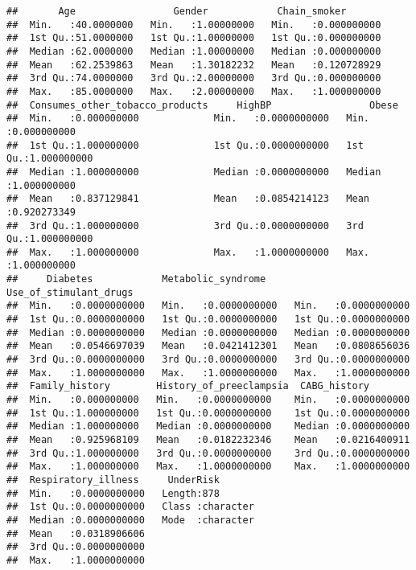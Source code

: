 \documentclass[
  10pt,
  spanish,
]{article}
\begin{document}
\begin{verbatim}
##       Age                 Gender            Chain_smoker        
##  Min.   :40.0000000   Min.   :1.00000000   Min.   :0.000000000  
##  1st Qu.:51.0000000   1st Qu.:1.00000000   1st Qu.:0.000000000  
##  Median :62.0000000   Median :1.00000000   Median :0.000000000  
##  Mean   :62.2539863   Mean   :1.30182232   Mean   :0.120728929  
##  3rd Qu.:74.0000000   3rd Qu.:2.00000000   3rd Qu.:0.000000000  
##  Max.   :85.0000000   Max.   :2.00000000   Max.   :1.000000000  
##  Consumes_other_tobacco_products     HighBP                 Obese            
##  Min.   :0.000000000             Min.   :0.0000000000   Min.   :0.000000000  
##  1st Qu.:1.000000000             1st Qu.:0.0000000000   1st Qu.:1.000000000  
##  Median :1.000000000             Median :0.0000000000   Median :1.000000000  
##  Mean   :0.837129841             Mean   :0.0854214123   Mean   :0.920273349  
##  3rd Qu.:1.000000000             3rd Qu.:0.0000000000   3rd Qu.:1.000000000  
##  Max.   :1.000000000             Max.   :1.0000000000   Max.   :1.000000000  
##     Diabetes            Metabolic_syndrome     Use_of_stimulant_drugs
##  Min.   :0.0000000000   Min.   :0.0000000000   Min.   :0.0000000000  
##  1st Qu.:0.0000000000   1st Qu.:0.0000000000   1st Qu.:0.0000000000  
##  Median :0.0000000000   Median :0.0000000000   Median :0.0000000000  
##  Mean   :0.0546697039   Mean   :0.0421412301   Mean   :0.0808656036  
##  3rd Qu.:0.0000000000   3rd Qu.:0.0000000000   3rd Qu.:0.0000000000  
##  Max.   :1.0000000000   Max.   :1.0000000000   Max.   :1.0000000000  
##  Family_history        History_of_preeclampsia  CABG_history         
##  Min.   :0.000000000   Min.   :0.0000000000    Min.   :0.0000000000  
##  1st Qu.:1.000000000   1st Qu.:0.0000000000    1st Qu.:0.0000000000  
##  Median :1.000000000   Median :0.0000000000    Median :0.0000000000  
##  Mean   :0.925968109   Mean   :0.0182232346    Mean   :0.0216400911  
##  3rd Qu.:1.000000000   3rd Qu.:0.0000000000    3rd Qu.:0.0000000000  
##  Max.   :1.000000000   Max.   :1.0000000000    Max.   :1.0000000000  
##  Respiratory_illness     UnderRisk        
##  Min.   :0.0000000000   Length:878        
##  1st Qu.:0.0000000000   Class :character  
##  Median :0.0000000000   Mode  :character  
##  Mean   :0.0318906606                     
##  3rd Qu.:0.0000000000                     
##  Max.   :1.0000000000
\end{verbatim}
\end{document}
